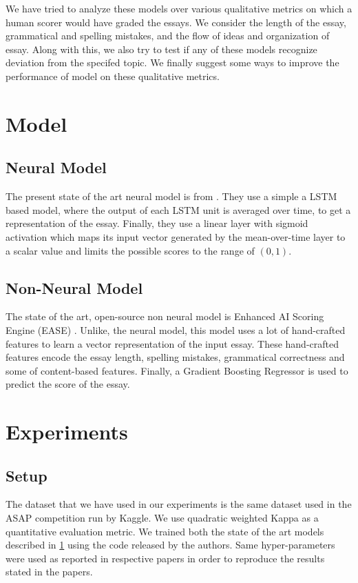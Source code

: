 \documentclass[11pt,a4paper]{article}
\begin{document}
We have tried to analyze these models over various qualitative metrics on which a human scorer would have graded the essays. We consider the length of the essay, grammatical and spelling mistakes, and the flow of ideas and organization of essay. Along with this, we also try to test if any of these models recognize deviation from the specifed topic. We finally suggest some ways to improve the performance of model on these qualitative metrics.



\section{Model}\label{sec:models}

\subsection{Neural Model}

The present state of the art neural model is from \cite{taghipour2016neural}. They use a simple a LSTM based model, where the output of each LSTM unit is averaged over time, to get a representation of the essay. Finally, they use a linear layer with sigmoid activation which maps its input vector generated by the mean-over-time layer to a scalar value and limits the possible scores to the range of $(0, 1)$.

\subsection{Non-Neural Model}

The state of the art, open-source non neural model is Enhanced AI Scoring Engine (EASE) \cite{ease}. Unlike, the neural model, this model uses a lot of hand-crafted features to learn a vector representation of the input essay. These hand-crafted features encode the essay length, spelling mistakes, grammatical correctness and some of content-based features. Finally, a Gradient Boosting Regressor is used to predict the score of the essay.


\section{Experiments}

\subsection{Setup}
The dataset that we have used in our experiments is the same dataset used in the ASAP competition run by Kaggle. We use quadratic weighted Kappa as a quantitative evaluation metric. We trained both the state of the art models described in \cref{sec:models} using the code released by the authors. Same hyper-parameters were used as reported in respective papers in order to reproduce the results stated in the papers.
\end{document}
